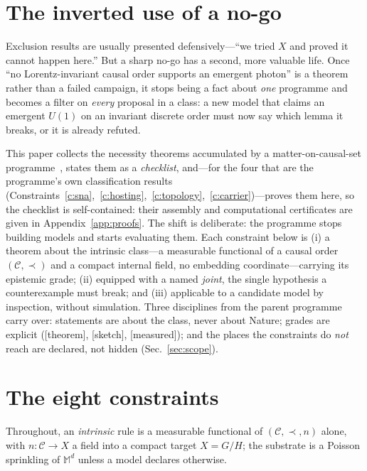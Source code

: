 \documentclass[aps,prd,reprint,nofootinbib,superscriptaddress,floatfix]{revtex4-2}
\begin{document}
\section{The inverted use of a no-go}
\label{sec:intro}

Exclusion results are usually presented defensively---``we tried $X$ and proved it cannot
happen here.'' But a sharp no-go has a second, more valuable life. Once ``no
Lorentz-invariant causal order supports an emergent photon'' is a theorem rather than a
failed campaign, it stops being a fact about \emph{one} programme and becomes a filter on
\emph{every} proposal in a class: a new model that claims an emergent $U(1)$ on an
invariant discrete order must now say which lemma it breaks, or it is already refuted.

This paper collects the necessity theorems accumulated by a matter-on-causal-set
programme~\cite{CorePaper,WenComplement,MatterGravityPRD,SU3PRD}, states them as a
\emph{checklist}, and---for the four that are the programme's own classification results
(Constraints~\ref{c:sna},~\ref{c:hosting},~\ref{c:topology},~\ref{c:carrier})---proves them
here, so the checklist is self-contained: their assembly and computational certificates are
given in Appendix~\ref{app:proofs}. The shift is deliberate: the programme stops building
models and starts evaluating them. Each constraint below is (i) a theorem about the intrinsic
class---a measurable functional of a causal order $(\mathcal C,\prec)$ and a compact internal
field, no embedding coordinate---carrying its epistemic grade; (ii) equipped with a named
\emph{joint}, the single hypothesis a counterexample must break; and (iii) applicable to a
candidate model by inspection, without simulation. Three disciplines from the parent programme
carry over: statements are about the class, never about Nature; grades are explicit
([theorem], [sketch], [measured]); and the places the constraints do \emph{not} reach are
declared, not hidden (Sec.~\ref{sec:scope}).

\section{The eight constraints}
\label{sec:constraints}

Throughout, an \emph{intrinsic} rule is a measurable functional of $(\mathcal C,\prec,n)$
alone, with $n\colon\mathcal C\to X$ a field into a compact target $X=G/H$; the substrate
is a Poisson sprinkling of $\mathbb M^d$ unless a model declares otherwise.
\end{document}
